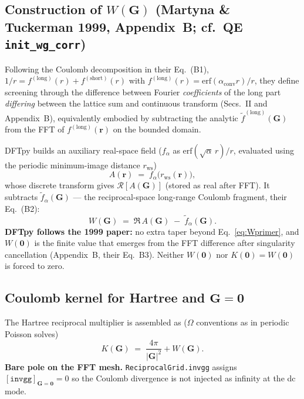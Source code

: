 \documentclass[11pt,a4paper]{article}
\begin{document}
\subsection{Construction of $W(\mathbf G)$ (Martyna \& Tuckerman 1999, Appendix~B; cf.\ QE \texttt{init\_wg\_corr})}

Following the Coulomb decomposition in their Eq.~(B1),
$1/r = f^{(\mathrm{long})}(r)+f^{(\mathrm{short})}(r)$ with
$f^{(\mathrm{long})}(r)=\mathrm{erf}(\alpha_{\mathrm{conv}} r)/r$,
they define screening through the difference between Fourier \emph{coefficients} of the long
part \emph{differing} between the lattice sum and continuous transform (Secs.~II and Appendix~B),
equivalently embodied by subtracting the analytic $\tilde f^{(\mathrm{long})}(\mathbf G)$ from the
FFT of $f^{(\mathrm{long})}(\mathbf r)$ on the bounded domain.

DFTpy builds an auxiliary real-space field ($f_\alpha$ as $\mathrm{erf}(\sqrt{\alpha}\, r)/r$, evaluated using the periodic minimum-image distance $r_{\mathrm{ws}}$)
\begin{equation}
  A(\mathbf r) \;=\; f_\alpha\!\bigl(r_{\mathrm{ws}}(\mathbf r)\bigr),
\end{equation}
whose discrete transform gives $\mathcal{R}[A(\mathbf G)]$ (stored as real after FFT).
It subtracts $\tilde f_\alpha(\mathbf G)$ --- the reciprocal-space long-range Coulomb fragment, their Eq.~(B2):
\begin{equation}
  \label{eq:Wprimer}
  W(\mathbf G) \;=\; \Re\,A(\mathbf G) \;-\; \tilde f_\alpha(\mathbf G).
\end{equation}
\textbf{DFTpy follows the 1999 paper:} no extra taper beyond Eq.~\eqref{eq:Wprimer}, and $W(\mathbf 0)$
is the finite value that emerges from the FFT difference after singularity cancellation
(Appendix~B, their Eq.~B3).  Neither $W(\mathbf 0)$ nor $K(\mathbf 0)=W(\mathbf 0)$ is
forced to zero.

\subsection{Coulomb kernel for Hartree and $\mathbf G=\mathbf 0$}

The Hartree reciprocal multiplier is assembled as ($\Omega$ conventions as in periodic Poisson solves)
\begin{equation}
  \label{eq:Kdef}
  K(\mathbf G) \;=\; \frac{4\pi}{|\mathbf G|^2} + W(\mathbf G).
\end{equation}
\textbf{Bare pole on the FFT mesh.}
\texttt{ReciprocalGrid.invgg} assigns $[\texttt{invgg}]_{\mathbf G=\mathbf 0}=0$ so the Coulomb divergence is not injected as infinity at the dc mode.
\end{document}
